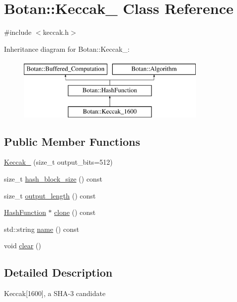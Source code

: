 \hypertarget{classBotan_1_1Keccak__1600}{\section{Botan\-:\-:Keccak\-\_ Class Reference}
\label{classBotan_1_1Keccak__1600}
}


{\ttfamily \#include $<$keccak.\-h$>$}

Inheritance diagram for Botan\-:\-:Keccak\-\_\-:\begin{figure}[H]
\begin{center}
\leavevmode
\includegraphics[height=3.000000cm]{classBotan_1_1Keccak__1600}
\end{center}
\end{figure}
\subsection*{Public Member Functions}
\begin{DoxyCompactItemize}
\item 
\hyperlink{classBotan_1_1Keccak__1600_a91c84f1f153077f1aef01df6a773fe80}{Keccak\-\_} (size\-\_\-t output\-\_\-bits=512)
\item 
size\-\_\-t \hyperlink{classBotan_1_1Keccak__1600_a3f8aa77ff0337bbe33e68e2852ecb621}{hash\-\_\-block\-\_\-size} () const 
\item 
size\-\_\-t \hyperlink{classBotan_1_1Keccak__1600_a8353576d851cf2e24b03276bff9fc7a7}{output\-\_\-length} () const 
\item 
\hyperlink{classBotan_1_1HashFunction}{Hash\-Function} $\ast$ \hyperlink{classBotan_1_1Keccak__1600_ae24a6a9db123f9f55c95f646c2739f04}{clone} () const 
\item 
std\-::string \hyperlink{classBotan_1_1Keccak__1600_a5306ac327626fa9150f5328db38da938}{name} () const 
\item 
void \hyperlink{classBotan_1_1Keccak__1600_ad82cba824650d28eccf3dab44728cd58}{clear} ()
\end{DoxyCompactItemize}


\subsection{Detailed Description}
Keccak\mbox{[}1600\mbox{]}, a S\-H\-A-\/3 candidate 

